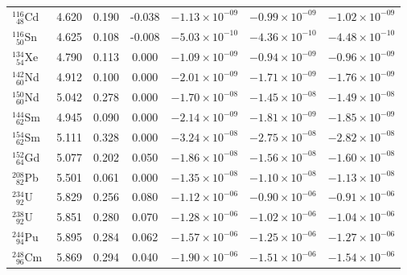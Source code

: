 \begin{table}
\begin{minipage}{1.1\textwidth}
\begin{tabular}{lcccccc}
$^{116}_{\phantom{0}48}$Cd$\;$\footnotemark[1]           & 4.620 & 0.190                 & -0.038        & $-1.13\times 10^{-09}$ & $-0.99\times 10^{-09}$ & $-1.02\times 10^{-09}$ \\[4pt]
$^{116}_{\phantom{0}50}$Sn$\;$\footnotemark[1]           & 4.625 & 0.108                 & -0.008        & $-5.03\times 10^{-10}$ & $-4.36\times 10^{-10}$ & $-4.48\times 10^{-10}$ \\[4pt]
$^{134}_{\phantom{0}54}$Xe$\;$\footnotemark[1]           & 4.790 & 0.113                 & 0.000         & $-1.09\times 10^{-09}$ & $-0.94\times 10^{-09}$ & $-0.96\times 10^{-09}$ \\[4pt]
$^{142}_{\phantom{0}60}$Nd$\;$\footnotemark[2]           & 4.912 & 0.100                 & 0.000         & $-2.01\times 10^{-09}$ & $-1.71\times 10^{-09}$ & $-1.76\times 10^{-09}$ \\[4pt]
$^{150}_{\phantom{0}60}$Nd$\;$\footnotemark[2]           & 5.042 & 0.278                 & 0.000         & $-1.70\times 10^{-08}$ & $-1.45\times 10^{-08}$ & $-1.49\times 10^{-08}$ \\[4pt]
$^{144}_{\phantom{0}62}$Sm$\;$\footnotemark[2]           & 4.945 & 0.090                 & 0.000         & $-2.14\times 10^{-09}$ & $-1.81\times 10^{-09}$ & $-1.85\times 10^{-09}$ \\[4pt]
$^{154}_{\phantom{0}62}$Sm$\;$\footnotemark[2]           & 5.111 & 0.328                 & 0.000         & $-3.24\times 10^{-08}$ & $-2.75\times 10^{-08}$ & $-2.82\times 10^{-08}$ \\[4pt]
$^{152}_{\phantom{0}64}$Gd$\;$\footnotemark[1]           & 5.077 & 0.202                 & 0.050         & $-1.86\times 10^{-08}$ & $-1.56\times 10^{-08}$ & $-1.60\times 10^{-08}$ \\[4pt]
$^{208}_{\phantom{0}82}$Pb$\;$\footnotemark[1]           & 5.501 & 0.061                 & 0.000         & $-1.35\times 10^{-08}$ & $-1.10\times 10^{-08}$ & $-1.13\times 10^{-08}$ \\[4pt]
$^{234}_{\phantom{0}92}$U$\;$\footnotemark[2]            & 5.829 & 0.256                 & 0.080         & $-1.12\times 10^{-06}$ & $-0.90\times 10^{-06}$ & $-0.91\times 10^{-06}$ \\[4pt]
$^{238}_{\phantom{0}92}$U$\;$\footnotemark[2]            & 5.851 & 0.280                 & 0.070         & $-1.28\times 10^{-06}$ & $-1.02\times 10^{-06}$ & $-1.04\times 10^{-06}$ \\[4pt]
$^{244}_{\phantom{0}94}$Pu$\;$\footnotemark[1]           & 5.895 & 0.284                 & 0.062         & $-1.57\times 10^{-06}$ & $-1.25\times 10^{-06}$ & $-1.27\times 10^{-06}$ \\[4pt]
$^{248}_{\phantom{0}96}$Cm$\;$\footnotemark[1]           & 5.869 & 0.294                 & 0.040         & $-1.90\times 10^{-06}$ & $-1.51\times 10^{-06}$ & $-1.54\times 10^{-06}$
\end{tabular}
\end{minipage}
\end{table}
\clearpage
